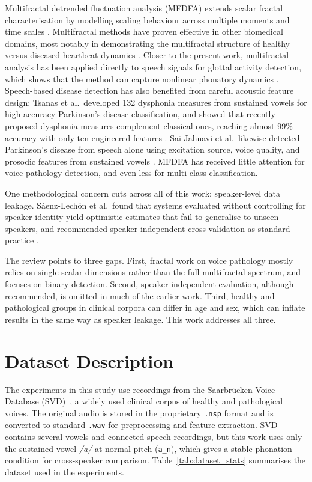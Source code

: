 \documentclass[runningheads]{llncs}
\begin{document}
  Multifractal detrended fluctuation analysis (MFDFA) extends scalar fractal characterisation by modelling scaling behaviour across multiple moments and time scales \cite{mfdfa}. Multifractal methods have proven effective in other biomedical domains, most notably in demonstrating the multifractal structure of healthy versus diseased heartbeat dynamics \cite{ivanov1999}. Closer to the present work, multifractal analysis has been applied directly to speech signals for glottal activity detection, which shows that the method can capture nonlinear phonatory dynamics \cite{lal2020multifractal}. Speech-based disease detection has also benefited from careful acoustic feature design: Tsanas et al.\ developed 132 dysphonia measures from sustained vowels for high-accuracy Parkinson's disease classification, and showed that recently proposed dysphonia measures complement classical ones, reaching almost 99\% accuracy with only ten engineered features \cite{tsanas2012}. Sai Jahnavi et al.\ likewise detected Parkinson's disease from speech alone using excitation source, voice quality, and prosodic features from sustained vowels \cite{jahnavi2020}. MFDFA has received little attention for voice pathology detection, and even less for multi-class classification.

  One methodological concern cuts across all of this work: speaker-level data leakage. Sáenz-Lechón et al.\ found that systems evaluated without controlling for speaker identity yield optimistic estimates that fail to generalise to unseen speakers, and recommended speaker-independent cross-validation as standard practice \cite{saenzlechon2006}.

  The review points to three gaps. First, fractal work on voice pathology mostly relies on single scalar dimensions rather than the full multifractal spectrum, and focuses on binary detection. Second, speaker-independent evaluation, although recommended, is omitted in much of the earlier work. Third, healthy and pathological groups in clinical corpora can differ in age and sex, which can inflate results in the same way as speaker leakage. This work addresses all three.


  \section{Dataset Description}
  \label{sec:dataset}

  The experiments in this study use recordings from the Saarbrücken Voice Database (SVD)~\cite{svd}, a widely used clinical corpus of healthy and pathological voices. The original audio is stored in the proprietary \texttt{.nsp} format and is converted to standard \texttt{.wav} for preprocessing and feature extraction. SVD contains several vowels and connected-speech recordings, but this work uses only the sustained vowel \textit{/a/} at normal pitch (\texttt{a\_n}), which gives a stable phonation condition for cross-speaker comparison. Table~\ref{tab:dataset_stats} summarises the dataset used in the experiments.
\end{document}
